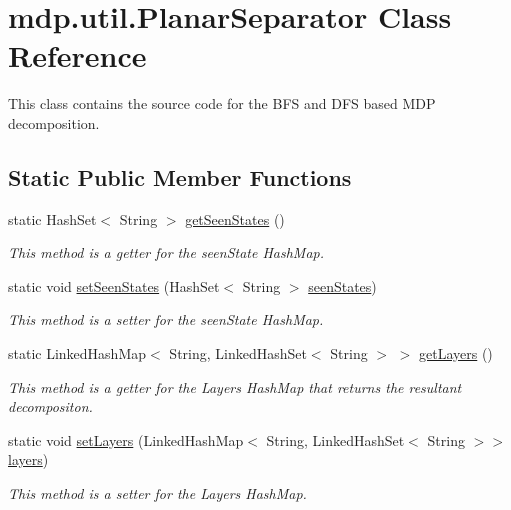 \hypertarget{classmdp_1_1util_1_1_planar_separator}{}\section{mdp.\+util.\+Planar\+Separator Class Reference}
\label{classmdp_1_1util_1_1_planar_separator}


This class contains the source code for the B\+F\+S and D\+F\+S based M\+D\+P decomposition.  


\subsection*{Static Public Member Functions}
\begin{DoxyCompactItemize}
\item 
static Hash\+Set$<$ String $>$ \hyperlink{classmdp_1_1util_1_1_planar_separator_ac3598afe245825249dbd664802be6227}{get\+Seen\+States} ()
\begin{DoxyCompactList}\small\item\em This method is a getter for the seen\+State Hash\+Map. \end{DoxyCompactList}\item 
static void \hyperlink{classmdp_1_1util_1_1_planar_separator_aabe861ae900f6aa09a2f0acbe14b1eae}{set\+Seen\+States} (Hash\+Set$<$ String $>$ \hyperlink{classmdp_1_1util_1_1_planar_separator_a9abf62832f8732e6f6304db702296da9}{seen\+States})
\begin{DoxyCompactList}\small\item\em This method is a setter for the seen\+State Hash\+Map. \end{DoxyCompactList}\item 
static Linked\+Hash\+Map$<$ String, Linked\+Hash\+Set$<$ String $>$ $>$ \hyperlink{classmdp_1_1util_1_1_planar_separator_a487dad33c51e930d2dcdcc6498f55b23}{get\+Layers} ()
\begin{DoxyCompactList}\small\item\em This method is a getter for the Layers Hash\+Map that returns the resultant decompositon. \end{DoxyCompactList}\item 
static void \hyperlink{classmdp_1_1util_1_1_planar_separator_aa025c1c44d3d9d3828ace982c6ed1092}{set\+Layers} (Linked\+Hash\+Map$<$ String, Linked\+Hash\+Set$<$ String $>$$>$ \hyperlink{classmdp_1_1util_1_1_planar_separator_acb79e999c0d8e484b52978cd3225420e}{layers})
\begin{DoxyCompactList}\small\item\em This method is a setter for the Layers Hash\+Map. \end{DoxyCompactList}\item 
$$
\end{DoxyCompactItemize}
